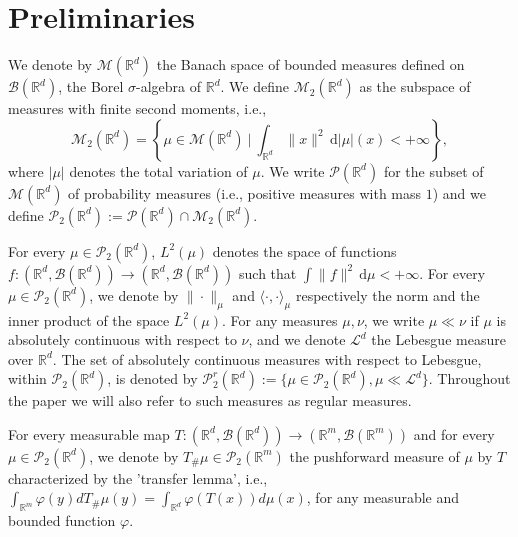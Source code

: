 \documentclass[11pt]{article}
\newcommand{\R}{\mathbb{R}}
\numberwithin{equation}{section}
\begin{document}
\section{Preliminaries}\label{sec:preliminaries}

We denote by $\mathcal{M}(\R^d)$ the Banach space of bounded measures defined on $\mathcal{B}(\mathbb{R}^d)$, the Borel $\sigma$-algebra of $\R^d$. We define $\mathcal{M}_2(\R^d)$ as the subspace of measures with finite second moments, i.e.,
\[\mathcal{M}_2(\R^d) = \left\{\mu \in \mathcal{M}(\R^d) \ \Big| \ \int_{\R^d} \|x\|^2 \,\mathrm{d} |\mu|(x) < +\infty \right\},\]
where $|\mu|$ denotes the total variation of $\mu$. We write $\mathcal{P}(\R^d)$ for the subset of $\mathcal{M}(\R^d)$ of probability measures (i.e., positive measures with mass $1$) and we define $\mathcal{P}_2(\R^d) := \mathcal{P}(\R^d) \cap \mathcal{M}_2(\R^d)$.

For every $\mu \in \mathcal{P}_2(\mathbb{R}^d)$, $L^2(\mu)$ denotes the space of functions $f : (\mathbb{R}^d, \mathcal{B}(\mathbb{R}^d)) \to (\mathbb{R}^d, \mathcal{B}(\mathbb{R}^d))$ such that $\int \|f\|^2 \, \mathrm{d}\mu < + \infty$. For every $\mu \in \mathcal{P}_2(\mathbb{R}^d)$, we denote by $\| \cdot \|_{\mu}$ and $\langle \cdot, \cdot \rangle_{\mu}$ respectively the norm and the inner product of the space $L^2(\mu)$. For any measures $\mu, \nu$, we write $\mu \ll \nu$ if $\mu$ is absolutely continuous with respect to $\nu$, and we denote $\mathcal{L}^d$ the Lebesgue measure over $\mathbb{R}^d$. The set of absolutely continuous measures with respect to Lebesgue, within $\mathcal{P}_2(\R^d)$, is denoted by $\mathcal{P}_2^r(\mathbb{R}^d) := \{\mu \in \mathcal{P}_2(\mathbb{R}^d), \mu \ll \mathcal{L}^d\}$. Throughout the paper we will also refer to such measures as regular measures.

For every measurable map $T:(\mathbb{R}^d, \mathcal{B}(\mathbb{R}^d))\to (\mathbb{R}^m, \mathcal{B}(\mathbb{R}^m))$ and for every $\mu \in \mathcal{P}_2(\mathbb{R}^d)$, we denote by $T_{\#}\mu\in \mathcal{P}_2(\R^m)$ the pushforward measure of $\mu$ by $ T $ characterized by the 'transfer lemma', i.e., $
\int_{\R^m} \varphi(y) dT_{\#} \mu(y) = \int_{\R^d} \varphi(T(x)) d\mu(x)$, for any measurable and bounded function $\varphi$.
\end{document}
